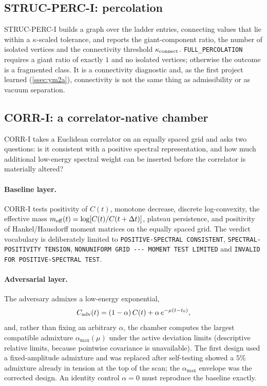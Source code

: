 \documentclass[11pt,a4paper]{article}
\theoremstyle{definition}
\theoremstyle{remark}
\begin{document}
\subsection{STRUC-PERC-I: percolation}\label{ssec:strucperc}
STRUC-PERC-I builds a graph over the ladder entries, connecting values that lie within a $\kappa$-scaled tolerance, and reports the giant-component ratio, the number of isolated vertices and the connectivity threshold $\kappa_{\rm connect}$. \texttt{FULL\_PERCOLATION} requires a giant ratio of exactly $1$ and no isolated vertices; otherwise the outcome is a fragmented class. It is a connectivity diagnostic and, as the first project learned (\cref{ssec:ym2a}), connectivity is not the same thing as admissibility or as vacuum separation.

\subsection{CORR-I: a correlator-native chamber}\label{ssec:corri}
CORR-I takes a Euclidean correlator on an equally spaced grid and asks two questions: is it consistent with a positive spectral representation, and how much additional low-energy spectral weight can be inserted before the correlator is materially altered?

\paragraph{Baseline layer.} CORR-I tests positivity of $C(t)$, monotone decrease, discrete log-convexity, the effective mass $m_{\rm eff}(t)=\log[C(t)/C(t+\Delta t)]$, plateau persistence, and positivity of Hankel/Hausdorff moment matrices on the equally spaced grid. The verdict vocabulary is deliberately limited to \texttt{POSITIVE-\allowbreak{}SPECTRAL CONSISTENT}, \texttt{SPECTRAL-\allowbreak{}POSITIVITY TENSION}, \texttt{NONUNIFORM GRID -\allowbreak{}-\allowbreak{}-\allowbreak{} MOMENT TEST LIMITED} and \texttt{INVALID FOR POSITIVE-\allowbreak{}SPECTRAL TEST}.

\paragraph{Adversarial layer.} The adversary admixes a low-energy exponential,
\begin{equation}
C_{\rm adv}(t)=(1-\alpha)\,C(t)+\alpha\,e^{-\mu(t-t_0)},
\end{equation}
and, rather than fixing an arbitrary $\alpha$, the chamber computes the largest compatible admixture $\alpha_{\max}(\mu)$ under the active deviation limits (descriptive relative limits, because pointwise covariance is unavailable). The first design used a fixed-amplitude admixture and was replaced after self-testing showed a $5\%$ admixture already in tension at the top of the scan; the $\alpha_{\max}$ envelope was the corrected design. An identity control $\alpha=0$ must reproduce the baseline exactly.
\end{document}
